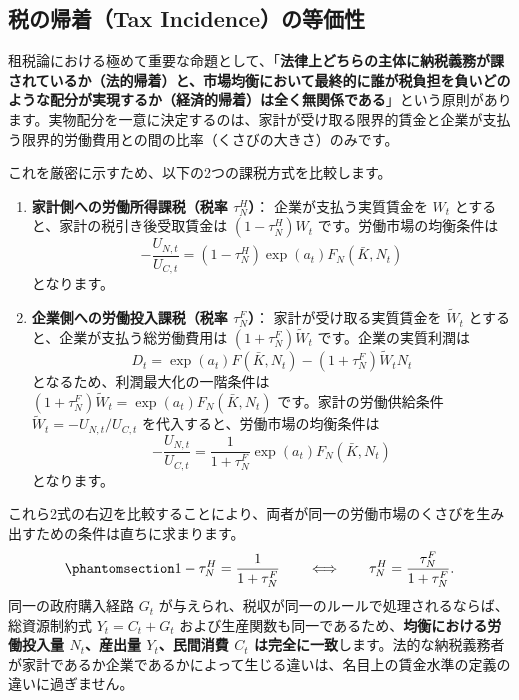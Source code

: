 \documentclass[
  japanese,
  lualatex,
  ja=standard,
  12pt,
  a4paper]{ltjsarticle}
\providecommand{\tightlist}{%
  \setlength{\itemsep}{0pt}\setlength{\parskip}{0pt}}
\begin{document}
\subsection{税の帰着（Tax
Incidence）の等価性}\label{ux7a0eux306eux5e30ux7740tax-incidenceux306eux7b49ux4fa1ux6027}

租税論における極めて重要な命題として、「\textbf{法律上どちらの主体に納税義務が課されているか（法的帰着）と、市場均衡において最終的に誰が税負担を負いどのような配分が実現するか（経済的帰着）は全く無関係である}」という原則があります。実物配分を一意に決定するのは、家計が受け取る限界的賃金と企業が支払う限界的労働費用との間の比率（くさびの大きさ）のみです。

これを厳密に示すため、以下の2つの課税方式を比較します。

\begin{enumerate}
\def\labelenumi{\arabic{enumi}.}
\tightlist
\item
  \textbf{家計側への労働所得課税（税率 \(\tau_N^H\)）}：
  企業が支払う実質賃金を \(W_t\) とすると、家計の税引き後受取賃金は
  \((1-\tau_N^H)W_t\) です。労働市場の均衡条件は \[
  -\frac{U_{N,t}}{U_{C,t}} = (1-\tau_N^H) \exp(a_t) F_N(\bar{K}, N_t)
  \] となります。
\item
  \textbf{企業側への労働投入課税（税率 \(\tau_N^F\)）}：
  家計が受け取る実質賃金を \(\widetilde{W}_t\)
  とすると、企業が支払う総労働費用は \((1+\tau_N^F)\widetilde{W}_t\)
  です。企業の実質利潤は \[
  D_t = \exp(a_t) F(\bar{K}, N_t) - (1+\tau_N^F) \widetilde{W}_t N_t
  \] となるため、利潤最大化の一階条件は
  \((1+\tau_N^F)\widetilde{W}_t = \exp(a_t) F_N(\bar{K}, N_t)\)
  です。家計の労働供給条件 \(\widetilde{W}_t = -U_{N,t}/U_{C,t}\)
  を代入すると、労働市場の均衡条件は \[
  -\frac{U_{N,t}}{U_{C,t}} = \frac{1}{1+\tau_N^F} \exp(a_t) F_N(\bar{K}, N_t)
  \] となります。
\end{enumerate}

これら2式の右辺を比較することにより、両者が同一の労働市場のくさびを生み出すための条件は直ちに求まります。
\begin{equation}\protect\phantomsection\label{eq-tax-incidence-equivalence}{
1 - \tau_N^H = \frac{1}{1+\tau_N^F} \qquad \Longleftrightarrow \qquad \tau_N^H = \frac{\tau_N^F}{1+\tau_N^F}.
}\end{equation} 同一の政府購入経路 \(G_t\)
が与えられ、税収が同一のルールで処理されるならば、総資源制約式
\(Y_t = C_t + G_t\)
および生産関数も同一であるため、\textbf{均衡における労働投入量
\(N_t\)、産出量 \(Y_t\)、民間消費 \(C_t\)
は完全に一致}します。法的な納税義務者が家計であるか企業であるかによって生じる違いは、名目上の賃金水準の定義の違いに過ぎません。
\end{document}
